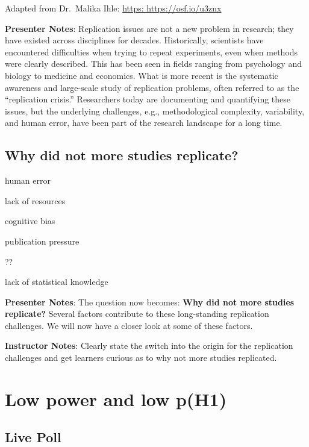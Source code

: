 \documentclass[
  letterpaper,
  DIV=11,
  numbers=noendperiod]{scrartcl}
\begin{document}
Adapted from Dr.~Malika Ihle: \href{https://osf.io/u3znx}{https:
https://osf.io/u3znx}

\textbf{Presenter Notes}: Replication issues are not a new problem in
research; they have existed across disciplines for decades.
Historically, scientists have encountered difficulties when trying to
repeat experiments, even when methods were clearly described. This has
been seen in fields ranging from psychology and biology to medicine and
economics. What is more recent is the systematic awareness and
large-scale study of replication problems, often referred to as the
``replication crisis.'' Researchers today are documenting and
quantifying these issues, but the underlying challenges, e.g.,
methodological complexity, variability, and human error, have been part
of the research landscape for a long time.

\subsection{Why did not more studies
replicate?}\label{why-did-not-more-studies-replicate}

human error

lack of resources

cognitive bias

publication pressure

??

lack of statistical knowledge

\textbf{Presenter Notes}: The question now becomes: \textbf{Why did not
more studies replicate?} Several factors contribute to these
long-standing replication challenges. We will now have a closer look at
some of these factors.

\textbf{Instructor Notes}: Clearly state the switch into the origin for
the replication challenges and get learners curious as to why not more
studies replicated.

\section{Low power and low p(H1)}\label{low-power-and-low-ph1}

\subsection{\texorpdfstring{ Live
Poll}{ Live Poll}}\label{b58fc729-690b-4000-b19f-365a4093b2ff7b7b3c2066612063686172742d6261722073697a653d3178203e7d7d-live-poll}
\end{document}
